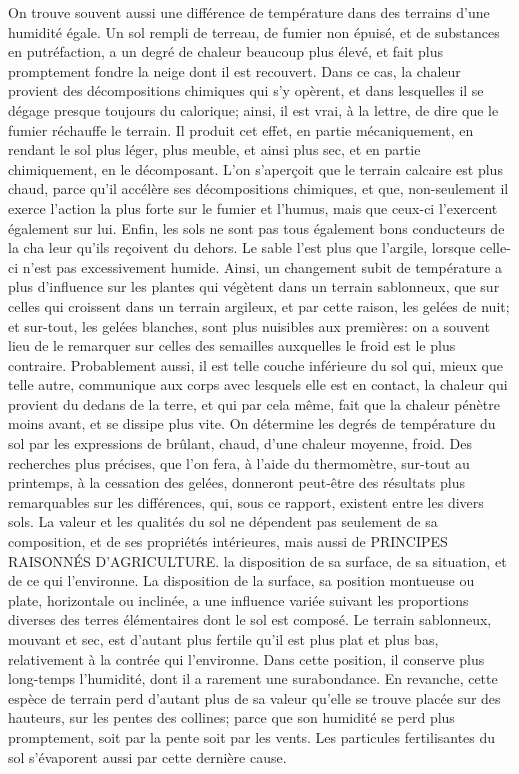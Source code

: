 On trouve souvent aussi une différence de température dans des terrains d'une humidité égale. Un sol rempli de terreau, de fumier non épuisé, et de substances en putréfaction, a un degré de chaleur beaucoup plus élevé, et fait plus promptement fondre la neige dont il est recouvert. Dans ce cas, la chaleur provient des décompositions chimiques qui s'y opèrent, et dans lesquelles il se dégage presque toujours du calorique; ainsi, il est vrai, à la lettre, de dire que le fumier réchauffe le terrain. Il produit cet effet, en partie mécaniquement, en rendant le sol plus léger, plus meuble, et ainsi plus sec, et en partie chimiquement, en le décomposant.
L'on s'aperçoit que le terrain calcaire est plus chaud, parce qu'il accélère ses décompositions chimiques, et que, non-seulement il exerce l'action la plus forte sur le fumier et l'humus, mais que ceux-ci l'exercent également sur lui. Enfin, les sols ne sont pas tous également bons conducteurs de la cha\setcounter{page}{186} leur qu'ils reçoivent du dehors. Le sable l'est plus que l'argile, lorsque celle-ci n'est pas excessivement humide. Ainsi, un changement subit de température a plus d'influence sur les plantes qui végètent dans un terrain sablonneux, que sur celles qui croissent dans un terrain argileux, et par cette raison, les gelées de nuit; et sur-tout, les gelées blanches, sont plus nuisibles aux premières: on a souvent lieu de le remarquer sur celles des semailles auxquelles le froid est le plus contraire. Probablement aussi, il est telle couche inférieure du sol qui, mieux que telle autre, communique aux corps avec lesquels elle est en contact, la chaleur qui provient du dedans de la terre, et qui par cela même, fait que la chaleur pénètre moins avant, et se dissipe plus vite.
On détermine les degrés de température du sol par les expressions de brûlant, chaud, d'une chaleur moyenne, froid.
Des recherches plus précises, que l'on fera, à l'aide du thermomètre, sur-tout au printemps, à la cessation des gelées, donneront peut-être des résultats plus remarquables sur les différences, qui, sous ce rapport, existent entre les divers sols.
La valeur et les qualités du sol ne dépendent pas seulement de sa composition, et de ses propriétés intérieures, mais aussi de\setcounter{page}{187} PRINCIPES RAISONNÉS D'AGRICULTURE.
la disposition de sa surface, de sa situation, et de ce qui l'environne.
La disposition de la surface, sa position montueuse ou plate, horizontale ou inclinée, a une influence variée suivant les proportions diverses des terres élémentaires dont le sol est composé.
Le terrain sablonneux, mouvant et sec, est d'autant plus fertile qu'il est plus plat et plus bas, relativement à la contrée qui l'environne. Dans cette position, il conserve plus long-temps l'humidité, dont il a rarement une surabondance. En revanche, cette espèce de terrain perd d'autant plus de sa valeur qu'elle se trouve placée sur des hauteurs, sur les pentes des collines; parce que son humidité se perd plus promptement, soit par la pente soit par les vents. Les particules fertilisantes du sol s'évaporent aussi par cette dernière cause.
